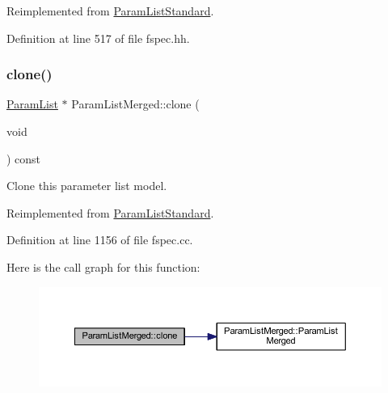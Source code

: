 Reimplemented from \mbox{\hyperlink{class_param_list_standard_a4819bb8291e202e3d11737d586878525}{Param\+List\+Standard}}.



Definition at line 517 of file fspec.\+hh.

\mbox{\label{class_param_list_merged_a98c49178195f02a964dd87b9e8fcddfa}} 
\subsubsection{\texorpdfstring{clone()}{clone()}}
{\footnotesize\ttfamily \mbox{\hyperlink{class_param_list}{Param\+List}} $\ast$ Param\+List\+Merged\+::clone (\begin{DoxyParamCaption}\item[{void}]{ }\end{DoxyParamCaption}) const\hspace{0.3cm}{\ttfamily [virtual]}}



Clone this parameter list model. 



Reimplemented from \mbox{\hyperlink{class_param_list_standard_a8257219823fdb31ac4aa59d2c0c640e5}{Param\+List\+Standard}}.



Definition at line 1156 of file fspec.\+cc.

Here is the call graph for this function\+:
\nopagebreak
\begin{figure}[H]
\begin{center}
\leavevmode
\includegraphics[width=350pt]{class_param_list_merged_a98c49178195f02a964dd87b9e8fcddfa_cgraph}
\end{center}
\end{figure}
\mbox{\label{class_param_list_merged_aa4252b6768505e059edfe83ebdbf2065}} 
